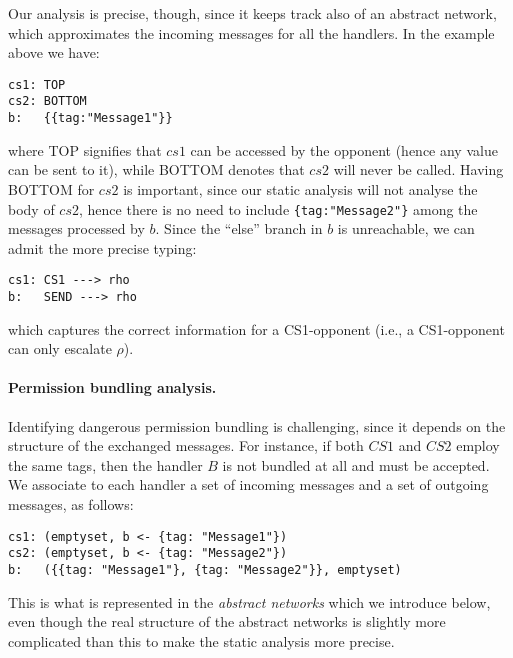 Our analysis is precise, though, since it keeps track also of an abstract network, which approximates the incoming messages for all the handlers. In the example above we have:
\begin{verbatim}
cs1: TOP
cs2: BOTTOM
b:   {{tag:"Message1"}}
\end{verbatim}
where TOP signifies that $cs1$ can be accessed by the opponent (hence any value can be sent to it), while BOTTOM denotes that $cs2$ will never be called. Having BOTTOM for $cs2$ is important, since our static analysis will not analyse the body of $cs2$, hence there is no need to include \texttt{\{tag:"Message2"\}} among the messages processed by $b$. Since the ``else'' branch in $b$ is unreachable, we can admit the more precise typing:
\begin{verbatim}
cs1: CS1 ---> rho
b:   SEND ---> rho
\end{verbatim}
which captures the correct information for a CS1-opponent (i.e., a CS1-opponent can only escalate $\rho$).

\paragraph{Permission bundling analysis.}
Identifying dangerous permission bundling is challenging, since it depends on the structure of the exchanged messages. For instance, if both $CS1$ and $CS2$ employ the same tags, then the handler $B$ is not bundled at all and must be accepted. We associate to each handler a set of incoming messages and a set of outgoing messages, as follows:
\begin{verbatim}
cs1: (emptyset, b <- {tag: "Message1"})
cs2: (emptyset, b <- {tag: "Message2"})
b:   ({{tag: "Message1"}, {tag: "Message2"}}, emptyset)
\end{verbatim}
This is what is represented in the \emph{abstract networks} which we introduce below, even though the real structure of the abstract networks is slightly more complicated than this to make the static analysis more precise.

